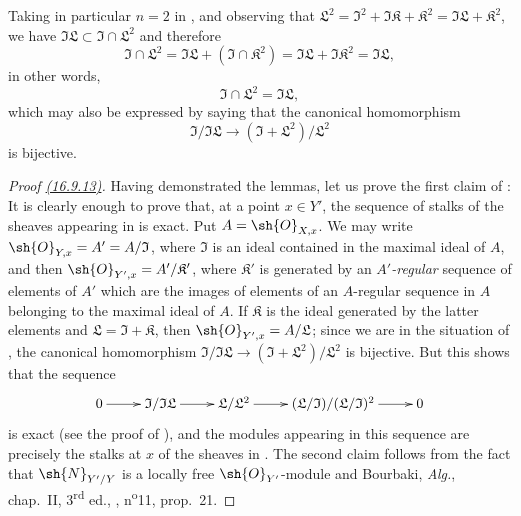 Taking in particular $n = 2$ in , and observing that $\mathfrak{L}^2 = \mathfrak{I}^2 + \mathfrak{I}\mathfrak{K} + \mathfrak{K}^2 = \mathfrak{I}\mathfrak{L} + \mathfrak{K}^2$, we have $\mathfrak{I}\mathfrak{L} \subset \mathfrak{I} \cap \mathfrak{L}^2$ and therefore
\[
  \mathfrak{I} \cap \mathfrak{L}^2 = \mathfrak{I}\mathfrak{L} + (\mathfrak{I} \cap \mathfrak{K}^2) = \mathfrak{I}\mathfrak{L} + \mathfrak{I}\mathfrak{K}^2 = \mathfrak{I}\mathfrak{L},
\]
in other words, 
\[
  \label{IV.16.9.13.7}
  \mathfrak{I} \cap \mathfrak{L}^2 = \mathfrak{I}\mathfrak{L},
  \tag{16.9.13.7}
\]
which may also be expressed by saying that the canonical homomorphism
\[
  \mathfrak{I}/\mathfrak{I}\mathfrak{L} \to (\mathfrak{I} + \mathfrak{L}^2)/\mathfrak{L}^2
\]
is bijective.

\begin{proof}[Proof {\hyperlink{ega4.c04.prop.16-9-13}{(16.9.13)}}]
Having demonstrated the lemmas, let us prove the first claim of :
It is clearly
enough to prove that, at a point $x \in Y'$, the sequence of stalks of the sheaves appearing in  is exact.
Put $A = \sh{O}_{X,x}$. We may write $\sh{O}_{Y,x} = A' = A/\mathfrak{I}$, where $\mathfrak{I}$ is an ideal contained in the maximal ideal of $A$, and then $\sh{O}_{Y',x} = A'/\mathfrak{K}'$, where $\mathfrak{K}'$ is generated by an \emph{$A'$-regular} sequence of elements of $A'$ which are the images of elements of an $A$-regular sequence in $A$ belonging to the maximal ideal of $A$.
If $\mathfrak{K}$ is the ideal generated by the latter elements and $\mathfrak{L} = \mathfrak{I} + \mathfrak{K}$, then $\sh{O}_{Y',x} = A/\mathfrak{L}$; since we are in the situation of , the canonical homomorphism $\mathfrak{I}/\mathfrak{I}\mathfrak{L} \to (\mathfrak{I} + \mathfrak{L}^2)/\mathfrak{L}^2$ is bijective.
But this shows that the sequence
\[
  \xymatrix{
    0 \ar[r] & \mathfrak{I}/\mathfrak{I}\mathfrak{L} \ar[r] & \mathfrak{L}/\mathfrak{L}^2 \ar[r] &  (\mathfrak{L}/\mathfrak{I})/(\mathfrak{L}/\mathfrak{I})^2 \ar[r] & 0
  }
\]
is exact (see the proof of ), and the modules appearing in this sequence are precisely the stalks at $x$ of the sheaves in .
The second claim follows from the fact that $\sh{N}_{Y'/Y}$ is a locally free $\sh{O}_{Y'}$-module  and Bourbaki, \emph{Alg.}, chap.~II, 3\textsuperscript{rd} ed., , n\textsuperscript{o}11, prop.\ 21.
\end{proof}

